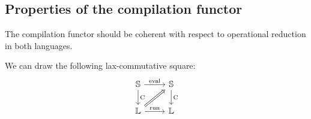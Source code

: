 \subsection{Properties of the compilation functor}

The compilation functor should be coherent with respect to operational
reduction in both languages.

We can draw the following lax-commutative square:
\begin{equation}
  \begin{tikzcd}
    \cat S \arrow[r, "\mathrm{eval}"] \arrow[d, "\fun C"] & \cat S \arrow[d, "\fun C"] \\
    \cat L \arrow[r, "\mathrm{run}"]  \arrow[Rightarrow,ur]                   & \cat L
  \end{tikzcd}
\end{equation}
